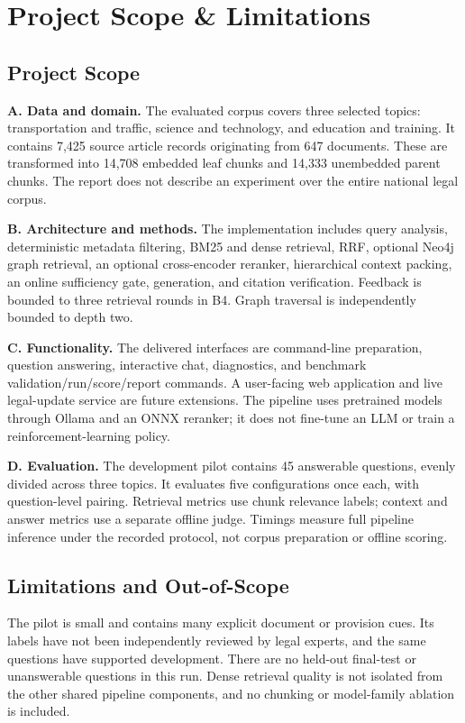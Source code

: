 \documentclass[11pt,a4paper,oneside]{report}
\begin{document}
\section{Project Scope \& Limitations}
\subsection{Project Scope}
\textbf{A. Data and domain.} The evaluated corpus covers three selected topics: transportation and traffic, science and technology, and education and training. It contains 7,425 source article records originating from 647 documents. These are transformed into 14,708 embedded leaf chunks and 14,333 unembedded parent chunks. The report does not describe an experiment over the entire national legal corpus.

\textbf{B. Architecture and methods.} The implementation includes query analysis, deterministic metadata filtering, BM25 and dense retrieval, RRF, optional Neo4j graph retrieval, an optional cross-encoder reranker, hierarchical context packing, an online sufficiency gate, generation, and citation verification. Feedback is bounded to three retrieval rounds in B4. Graph traversal is independently bounded to depth two.

\textbf{C. Functionality.} The delivered interfaces are command-line preparation, question answering, interactive chat, diagnostics, and benchmark validation/run/score/report commands. A user-facing web application and live legal-update service are future extensions. The pipeline uses pretrained models through Ollama and an ONNX reranker; it does not fine-tune an LLM or train a reinforcement-learning policy.

\textbf{D. Evaluation.} The development pilot contains 45 answerable questions, evenly divided across three topics. It evaluates five configurations once each, with question-level pairing. Retrieval metrics use chunk relevance labels; context and answer metrics use a separate offline judge. Timings measure full pipeline inference under the recorded protocol, not corpus preparation or offline scoring.

\subsection{Limitations and Out-of-Scope}
The pilot is small and contains many explicit document or provision cues. Its labels have not been independently reviewed by legal experts, and the same questions have supported development. There are no held-out final-test or unanswerable questions in this run. Dense retrieval quality is not isolated from the other shared pipeline components, and no chunking or model-family ablation is included.
\end{document}
